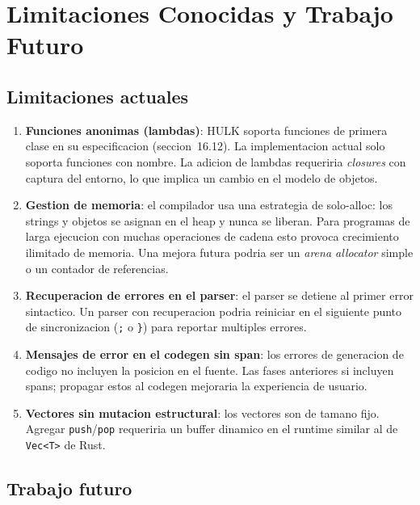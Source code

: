 \documentclass[12pt,a4paper]{article}
\begin{document}
\section{Limitaciones Conocidas y Trabajo Futuro}

\subsection{Limitaciones actuales}

\begin{enumerate}
  \item \textbf{Funciones anonimas (lambdas)}: HULK soporta funciones de primera clase
    en su especificacion (seccion~16.12). La implementacion actual solo soporta funciones
    con nombre. La adicion de lambdas requeriria \textit{closures} con captura del
    entorno, lo que implica un cambio en el modelo de objetos.
  \item \textbf{Gestion de memoria}: el compilador usa una estrategia de solo-alloc:
    los strings y objetos se asignan en el heap y nunca se liberan. Para programas de
    larga ejecucion con muchas operaciones de cadena esto provoca crecimiento ilimitado
    de memoria. Una mejora futura podria ser un \textit{arena allocator} simple o
    un contador de referencias.
  \item \textbf{Recuperacion de errores en el parser}: el parser se detiene al primer
    error sintactico. Un parser con recuperacion podria reiniciar en el siguiente
    punto de sincronizacion (\texttt{;} o \texttt{\}}) para reportar multiples errores.
  \item \textbf{Mensajes de error en el codegen sin span}: los errores de generacion
    de codigo no incluyen la posicion en el fuente. Las fases anteriores si incluyen
    spans; propagar estos al codegen mejoraria la experiencia de usuario.
  \item \textbf{Vectores sin mutacion estructural}: los vectores son de tamano fijo.
    Agregar \texttt{push}/\texttt{pop} requeriria un buffer dinamico en el runtime
    similar al de \texttt{Vec<T>} de Rust.
\end{enumerate}

\subsection{Trabajo futuro}
\end{document}
